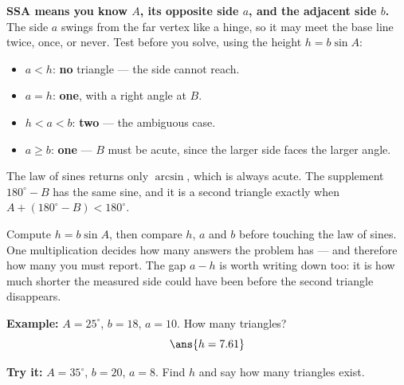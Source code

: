 \documentclass[12pt]{article}
\begin{document}

\begin{formulabox}
\textbf{SSA means you know $A$, its opposite side $a$, and the adjacent side
$b$.} The side $a$ swings from the far vertex like a hinge, so it may meet the
base line twice, once, or never. Test before you solve, using the height
$h = b\sin A$:
\begin{itemize}[leftmargin=0.9cm, itemsep=1pt, topsep=1pt]
\item $a < h$: \textbf{no} triangle --- the side cannot reach.
\item $a = h$: \textbf{one}, with a right angle at $B$.
\item $h < a < b$: \textbf{two} --- the ambiguous case.
\item $a \ge b$: \textbf{one} --- $B$ must be acute, since the larger side faces
the larger angle.
\end{itemize}
The law of sines returns only $\arcsin$, which is always acute. The supplement
$180^\circ - B$ has the same sine, and it is a second triangle exactly when
$A + (180^\circ - B) < 180^\circ$.
\end{formulabox}


\begin{formulabox}
Compute $h = b\sin A$, then compare $h$, $a$ and $b$ before touching the law of
sines. One multiplication decides how many answers the problem has --- and
therefore how many you must report. The gap $a - h$ is worth writing down too:
it is how much shorter the measured side could have been before the second
triangle disappears.
\end{formulabox}

\begin{examplebox}
\textbf{Example:} $A = 25^\circ$, $b = 18$, $a = 10$. How many triangles?
\[ \ans{h = 7.61} \]
\end{examplebox}

\begin{tryitbox}
\textbf{Try it:} $A = 35^\circ$, $b = 20$, $a = 8$. Find $h$ and say how many
triangles exist.

\end{tryitbox}
\end{document}
